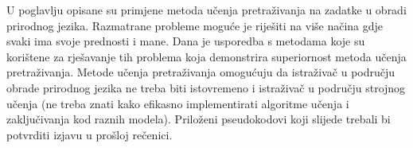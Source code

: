 U poglavlju opisane su primjene metoda učenja pretraživanja na zadatke u obradi
prirodnog jezika. Razmatrane probleme moguće je riješiti na više načina gdje
svaki ima svoje prednosti i mane. Dana je usporedba s metodama koje su korištene
za rješavanje tih problema koja demonstrira superiornost metoda učenja
pretraživanja. Metode učenja pretraživanja omogućuju da istraživač u području
obrade prirodnog jezika ne treba biti istovremeno i istraživač u području
strojnog učenja (ne treba znati kako efikasno implementirati algoritme učenja i
zaključivanja kod raznih modela). Priloženi pseudokodovi koji slijede trebali bi
potvrditi izjavu u prošloj rečenici.

